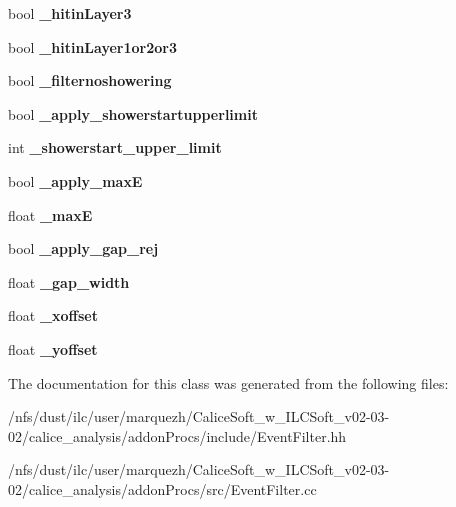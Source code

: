 \begin{DoxyCompactItemize}
\item 
bool {\bfseries \-\_\-hitin\-Layer3}\label{classCALICE_1_1EventFilter_a08bf1f9e0f910d28430f37eb74d5274b}

\item 
bool {\bfseries \-\_\-hitin\-Layer1or2or3}\label{classCALICE_1_1EventFilter_a00eb1957c50ee409c88bf6c0783288d4}

\item 
bool {\bfseries \-\_\-filternoshowering}\label{classCALICE_1_1EventFilter_a12d4e0cce8751ec9c6646d74f9c348c0}

\item 
bool {\bfseries \-\_\-apply\-\_\-showerstartupperlimit}\label{classCALICE_1_1EventFilter_a4048050dad7af244743d367aeb2852cd}

\item 
int {\bfseries \-\_\-showerstart\-\_\-upper\-\_\-limit}\label{classCALICE_1_1EventFilter_a978ba19843e906ebd72fbb1408217094}

\item 
bool {\bfseries \-\_\-apply\-\_\-max\-E}\label{classCALICE_1_1EventFilter_a773d99afe89bc3a391f756dd8150acae}

\item 
float {\bfseries \-\_\-max\-E}\label{classCALICE_1_1EventFilter_a907becf7b54c9484c0341f4c0bfec67c}

\item 
bool {\bfseries \-\_\-apply\-\_\-gap\-\_\-rej}\label{classCALICE_1_1EventFilter_a871f6d00a29b90b8569950de529c4e23}

\item 
float {\bfseries \-\_\-gap\-\_\-width}\label{classCALICE_1_1EventFilter_a85b5dce7dc62cec7b77b16c2d114121c}

\item 
float {\bfseries \-\_\-xoffset}\label{classCALICE_1_1EventFilter_a57519587aefeb6c7cc3e3f9914d16c1c}

\item 
float {\bfseries \-\_\-yoffset}\label{classCALICE_1_1EventFilter_a8aeb445a342ec9212f341049881561e6}

\end{DoxyCompactItemize}


The documentation for this class was generated from the following files\-:\begin{DoxyCompactItemize}
\item 
/nfs/dust/ilc/user/marquezh/\-Calice\-Soft\-\_\-w\-\_\-\-I\-L\-C\-Soft\-\_\-v02-\/03-\/02/calice\-\_\-analysis/addon\-Procs/include/Event\-Filter.\-hh\item 
/nfs/dust/ilc/user/marquezh/\-Calice\-Soft\-\_\-w\-\_\-\-I\-L\-C\-Soft\-\_\-v02-\/03-\/02/calice\-\_\-analysis/addon\-Procs/src/Event\-Filter.\-cc\end{DoxyCompactItemize}
